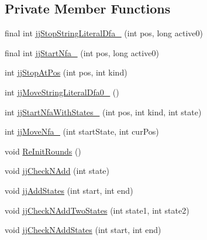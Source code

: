 \subsection*{Private Member Functions}
\begin{DoxyCompactItemize}
\item 
final int \hyperlink{classuk_1_1ac_1_1manchester_1_1cs_1_1owlapi_1_1dlsyntax_1_1parser_1_1_d_l_syntax_parser_token_manager_a65f5be109f705e1e78ef11166872bf39}{jj\-Stop\-String\-Literal\-Dfa\-\_} (int pos, long active0)
\item 
final int \hyperlink{classuk_1_1ac_1_1manchester_1_1cs_1_1owlapi_1_1dlsyntax_1_1parser_1_1_d_l_syntax_parser_token_manager_ad137bda2a8384737e26be074e9c37af6}{jj\-Start\-Nfa\-\_} (int pos, long active0)
\item 
int \hyperlink{classuk_1_1ac_1_1manchester_1_1cs_1_1owlapi_1_1dlsyntax_1_1parser_1_1_d_l_syntax_parser_token_manager_ac16fea1074ce4c04245169b52ecf5ea1}{jj\-Stop\-At\-Pos} (int pos, int kind)
\item 
int \hyperlink{classuk_1_1ac_1_1manchester_1_1cs_1_1owlapi_1_1dlsyntax_1_1parser_1_1_d_l_syntax_parser_token_manager_a9ed9254c2b536301a5d3aec633d5165b}{jj\-Move\-String\-Literal\-Dfa0\-\_} ()
\item 
int \hyperlink{classuk_1_1ac_1_1manchester_1_1cs_1_1owlapi_1_1dlsyntax_1_1parser_1_1_d_l_syntax_parser_token_manager_ac309d9be598ca817c1c43c9ad6e42269}{jj\-Start\-Nfa\-With\-States\-\_} (int pos, int kind, int state)
\item 
int \hyperlink{classuk_1_1ac_1_1manchester_1_1cs_1_1owlapi_1_1dlsyntax_1_1parser_1_1_d_l_syntax_parser_token_manager_a63a0e0cc4df7180aeb8daa212e2abaec}{jj\-Move\-Nfa\-\_} (int start\-State, int cur\-Pos)
\item 
void \hyperlink{classuk_1_1ac_1_1manchester_1_1cs_1_1owlapi_1_1dlsyntax_1_1parser_1_1_d_l_syntax_parser_token_manager_ad38c327802aa2bf33a4269a472283ef7}{Re\-Init\-Rounds} ()
\item 
void \hyperlink{classuk_1_1ac_1_1manchester_1_1cs_1_1owlapi_1_1dlsyntax_1_1parser_1_1_d_l_syntax_parser_token_manager_a0f8c1b01c4d2705ade74a082c7d66cbc}{jj\-Check\-N\-Add} (int state)
\item 
void \hyperlink{classuk_1_1ac_1_1manchester_1_1cs_1_1owlapi_1_1dlsyntax_1_1parser_1_1_d_l_syntax_parser_token_manager_a9a5cc5199bebce94b61cfd2df44e3743}{jj\-Add\-States} (int start, int end)
\item 
void \hyperlink{classuk_1_1ac_1_1manchester_1_1cs_1_1owlapi_1_1dlsyntax_1_1parser_1_1_d_l_syntax_parser_token_manager_aa45cbe4d28908850517f004873148763}{jj\-Check\-N\-Add\-Two\-States} (int state1, int state2)
\item 
void \hyperlink{classuk_1_1ac_1_1manchester_1_1cs_1_1owlapi_1_1dlsyntax_1_1parser_1_1_d_l_syntax_parser_token_manager_a7c13b0ae2e312a5c038fca5e6ffdf4a0}{jj\-Check\-N\-Add\-States} (int start, int end)
\end{DoxyCompactItemize}
